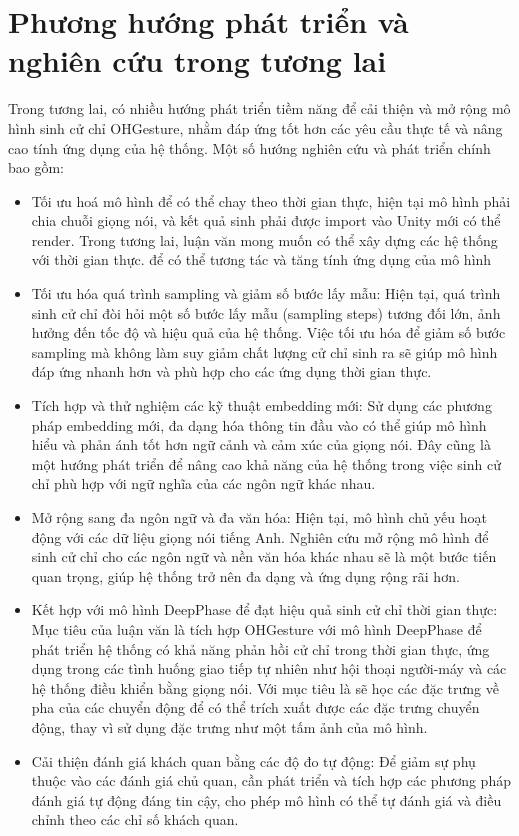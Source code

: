 \section{Phương hướng phát triển và nghiên cứu trong tương lai}


Trong tương lai, có nhiều hướng phát triển tiềm năng để cải thiện và mở rộng mô hình sinh cử chỉ OHGesture, nhằm đáp ứng tốt hơn các yêu cầu thực tế và nâng cao tính ứng dụng của hệ thống. Một số hướng nghiên cứu và phát triển chính bao gồm:

\begin{itemize}
	\item Tối ưu hoá mô hình để có thể chay theo thời gian thực, hiện tại mô hình phải chia chuỗi giọng nói, và kết quả sinh phải được  import vào Unity mới có thể render. Trong tương lai, luận văn mong muốn có thể xây dựng các hệ thống với thời gian thực. để có thể tương tác và tăng tính ứng dụng của mô hình
	
	\item Tối ưu hóa quá trình sampling và giảm số bước lấy mẫu: Hiện tại, quá trình sinh cử chỉ đòi hỏi một số bước lấy mẫu (sampling steps) tương đối lớn, ảnh hưởng đến tốc độ và hiệu quả của hệ thống. Việc tối ưu hóa để giảm số bước sampling mà không làm suy giảm chất lượng cử chỉ sinh ra sẽ giúp mô hình đáp ứng nhanh hơn và phù hợp cho các ứng dụng thời gian thực.
	
	\item Tích hợp và thử nghiệm các kỹ thuật embedding mới: Sử dụng các phương pháp embedding mới, đa dạng hóa thông tin đầu vào có thể giúp mô hình hiểu và phản ánh tốt hơn ngữ cảnh và cảm xúc của giọng nói. Đây cũng là một hướng phát triển để nâng cao khả năng của hệ thống trong việc sinh cử chỉ phù hợp với ngữ nghĩa của các ngôn ngữ khác nhau.
	
	\item Mở rộng sang đa ngôn ngữ và đa văn hóa: Hiện tại, mô hình chủ yếu hoạt động với các dữ liệu giọng nói tiếng Anh. Nghiên cứu mở rộng mô hình để sinh cử chỉ cho các ngôn ngữ và nền văn hóa khác nhau sẽ là một bước tiến quan trọng, giúp hệ thống trở nên đa dạng và ứng dụng rộng rãi hơn.
	
	\item Kết hợp với mô hình DeepPhase \cite{starke2022deepphase} để đạt hiệu quả sinh cử chỉ thời gian thực: Mục tiêu của luận văn là tích hợp OHGesture với mô hình DeepPhase để phát triển hệ thống có khả năng phản hồi cử chỉ trong thời gian thực, ứng dụng trong các tình huống giao tiếp tự nhiên như hội thoại người-máy và các hệ thống điều khiển bằng giọng nói. Với mục tiêu là sẽ học các đặc trưng về pha của các chuyển động để có thể trích xuất được các đặc trưng chuyển động, thay vì sử dụng đặc trưng như một tấm ảnh của mô hình.
	
	
	\item Cải thiện đánh giá khách quan bằng các độ đo tự động: Để giảm sự phụ thuộc vào các đánh giá chủ quan, cần phát triển và tích hợp các phương pháp đánh giá tự động đáng tin cậy, cho phép mô hình có thể tự đánh giá và điều chỉnh theo các chỉ số khách quan.
	\end{itemize}
